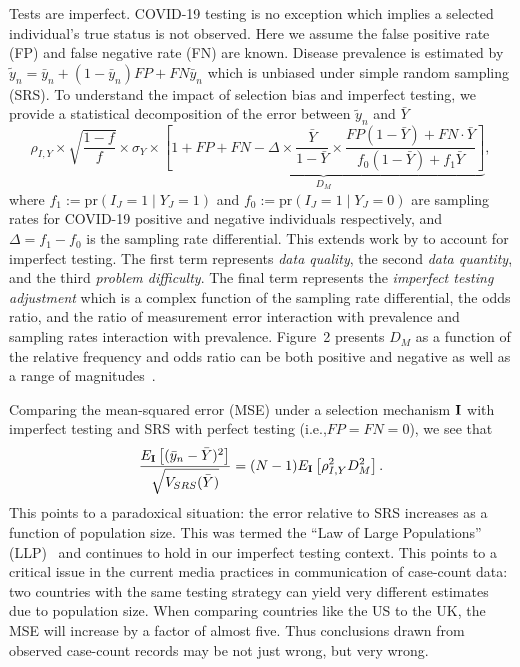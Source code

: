 \documentclass[12pt]{article}
\def\I{{\bf I}}
\def\pr{\text{pr}}
\begin{document}
Tests are imperfect.  COVID-19 testing is no exception which implies a selected individual's true status is not observed. Here we assume the false positive rate (FP) and false negative rate (FN) are known.  Disease prevalence is estimated by $\tilde y_n = \bar y_n + (1-\bar y_n) FP + FN \bar y_n$ which is unbiased under simple random sampling (SRS). To understand the impact of selection bias and imperfect testing, we provide a statistical decomposition of the error between $\tilde y_n$ and $\bar Y$
\begin{equation}
\label{eq:error}
\rho_{I,Y} \times \sqrt{\frac{1-f}{f}} \times \sigma_{Y}
\times \underbrace{\left[ 1 + FP + FN - \Delta \times \frac{\bar Y}{1-\bar Y} \times \frac{FP(1-\bar Y) + FN \cdot \bar Y}{f_0 (1-\bar Y) + f_1 \bar Y} \right]}_{D_M},
\end{equation}
where $f_1 := \pr (I_J = 1 \mid Y_J = 1)$ and $f_0 := \pr(I_J = 1 \mid Y_J = 0)$ are sampling rates for COVID-19 positive and negative individuals respectively, and $\Delta = f_1 - f_0$ is the sampling rate differential.  This extends work by \cite{Meng2018} to account for imperfect testing. The first term represents \emph{data quality}, the second \emph{data quantity}, and the third \emph{problem difficulty}.  The final term represents the \emph{imperfect testing adjustment} which is a complex function of the sampling rate differential, the odds ratio, and the ratio of measurement error interaction with prevalence and sampling rates interaction with prevalence. Figure~2 presents $D_M$ as a function of the relative frequency and odds ratio can be both positive and negative as well as a range of magnitudes~\cite{Beesley2020,Beesley2019,Smeden2019}.

Comparing the mean-squared error (MSE) under a selection mechanism $\I$ with imperfect testing and SRS with perfect testing (i.e.,$FP=FN=0$), we see that
$$
\frac{E_{\I} \left[ (\bar y_n - \bar Y)^2 \right]}{\sqrt{V_{SRS} (\bar Y)}} = (N-1) E_{\I} \left[ \rho_{I,Y}^2 D_M^2 \right].
$$
This points to a paradoxical situation: the error relative to SRS increases as a function of population size.  This was termed the ``Law of Large Populations'' (LLP)~\cite{Meng2018} and continues to hold in our imperfect testing context.  This points to a critical issue in the current media practices in communication of case-count data: two countries with the same testing strategy can yield very different estimates due to population size.  When comparing countries like the US to the UK, the MSE will increase by a factor of almost five.  Thus conclusions drawn from observed case-count records may be not just wrong, but very wrong.
\end{document}
